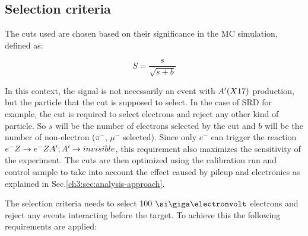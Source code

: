 \subsection{Selection criteria}
\label{ch3:sec:selection-criteria}

The cuts used are chosen based on their significance in the MC simulation, defined as:

\begin{equation}
  \label{eq:significance}
  S = \frac{s}{\sqrt{s + b}}
\end{equation}

In this context, the signal is not necessarily an event with $A'(X17)$ production, but the particle that the cut is supposed to select.
In the case of SRD for example, the cut is required to select electrons and reject any other kind of particle. So $s$ will be the number of electrons selected by the cut and $b$ will be the number of non-electron ($\pi^-$, $\mu^-$ selected). Since only $e^{-}$ can trigger the reaction $e^- Z \to e^- Z A'; A' \to invisible$, this requirement also maximizes the sensitivity of the experiment. The cuts are then optimized using the calibration run and control sample to take into account the effect caused by pileup and electronics as explained in Sec.\ref{ch3:sec:analysis-approach}.


The selection criteria needs to select 100 $\gev$ electrons and reject any events interacting before the target.
To achieve this the following requirements are applied:

